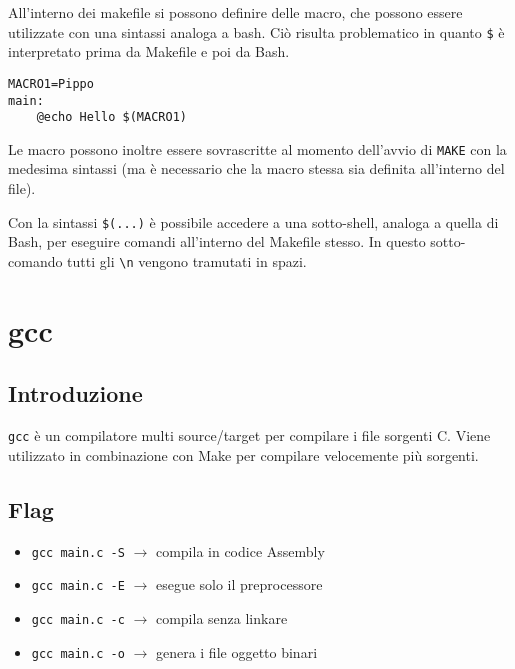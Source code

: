 \documentclass[11pt]{article}
\begin{document}
All'interno dei makefile si possono definire delle macro, che possono essere utilizzate con una sintassi analoga a bash. Ciò risulta problematico in quanto \verb|$| è interpretato prima da Makefile e poi da Bash.

\begin{verbatim}
MACRO1=Pippo
main:
    @echo Hello $(MACRO1)
\end{verbatim}

Le macro possono inoltre essere sovrascritte al momento dell'avvio di \verb|MAKE| con la medesima sintassi (ma è necessario che la macro stessa sia definita all'interno del file). 

Con la sintassi \verb|$(...)| è possibile accedere a una sotto-shell, analoga a quella di Bash, per eseguire comandi all'interno del Makefile stesso. In questo sotto-comando tutti gli \verb|\n| vengono tramutati in spazi.

\section{gcc}

\subsection{Introduzione}

\verb|gcc| è un compilatore multi source/target per compilare i file sorgenti C. Viene utilizzato in combinazione con Make per compilare velocemente più sorgenti.

\subsection{Flag}
\begin{itemize}
\item\verb|gcc main.c -S| $\rightarrow$ compila in codice Assembly
\item\verb|gcc main.c -E| $\rightarrow$ esegue solo il preprocessore
\item\verb|gcc main.c -c| $\rightarrow$ compila senza linkare
\item\verb|gcc main.c -o| $\rightarrow$ genera i file oggetto binari
\end{itemize}
\end{document}
